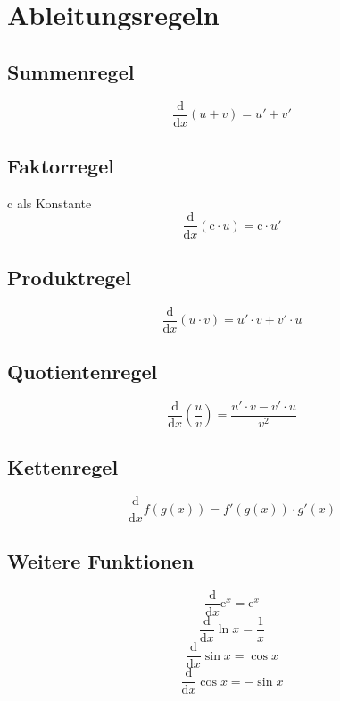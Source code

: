 \documentclass{article}
\begin{document}
 
 
\newcommand{\derive}{\frac{\mathrm{d}}{\mathrm{d}x}} 
  
\section{Ableitungsregeln}
 
\subsection*{Summenregel} 
\[ \derive (u + v) = u' + v' \]
  
\subsection*{Faktorregel}
$\mathrm{c}$ als Konstante 
\[ \derive (\mathrm{c} \cdot u) = \mathrm{c} \cdot u' \]
 
\subsection*{Produktregel} 
\[ \derive (u \cdot v) = u' \cdot v + v' \cdot u \] 
 
\subsection*{Quotientenregel} 
\[ \derive \left( \frac{u}{v} \right) = \frac{u' \cdot v - v' \cdot u}{v^2} \] 
 
\subsection*{Kettenregel}
\[ \derive f(g(x)) = f'(g(x)) \cdot g'(x) \]
 
\subsection*{Weitere Funktionen}
\[ \derive \mathrm{e}^x = \mathrm{e}^x \]
\[ \derive \ln x = \frac{1}{x} \]
\[ \derive \sin x = \cos x \] 
\[ \derive \cos x = -\sin x \] 
\end{document}
